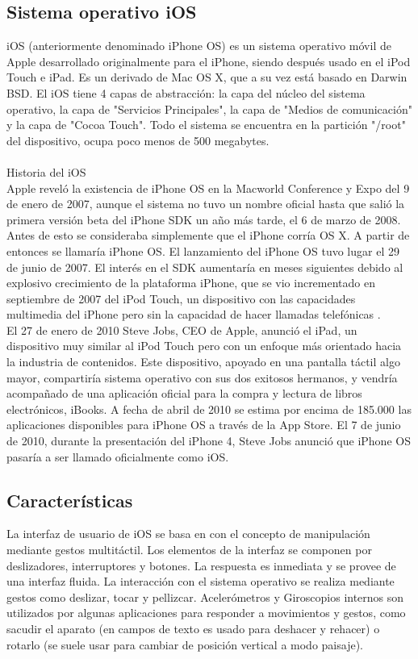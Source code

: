 	\subsection{Sistema operativo iOS}
	iOS (anteriormente denominado iPhone OS) es un sistema operativo móvil de Apple desarrollado originalmente para el iPhone, siendo después usado en el iPod Touch e iPad. Es un derivado de Mac OS X, que a su vez está basado en Darwin BSD. El iOS tiene 4 capas de abstracción: la capa del núcleo del sistema operativo, la capa de "Servicios Principales", la capa de "Medios de comunicación" y la capa de "Cocoa Touch". Todo el sistema se encuentra en la partición "/root" del dispositivo, ocupa poco menos de 500 megabytes\cite{11}.\\ \\
	Historia del iOS\\
	Apple reveló la existencia de iPhone OS en la Macworld Conference y Expo del 9 de enero de 2007, aunque el sistema no tuvo un nombre oficial hasta que salió la primera versión beta del iPhone SDK un año más tarde, el 6 de marzo de 2008. Antes de esto se consideraba simplemente que el iPhone corría OS X. A partir de entonces se llamaría iPhone OS. El lanzamiento del iPhone OS tuvo lugar el 29 de junio de 2007. El interés en el SDK aumentaría en meses siguientes debido al explosivo crecimiento de la plataforma iPhone, que se vio incrementado en septiembre de 2007 del iPod Touch, un dispositivo con las capacidades multimedia del iPhone pero sin la capacidad de hacer llamadas telefónicas \cite{12}.\\
	
	El 27 de enero de 2010 Steve Jobs, CEO de Apple, anunció el iPad, un dispositivo muy similar al iPod Touch pero con un enfoque más orientado hacia la industria de contenidos. Este dispositivo, apoyado en una pantalla táctil algo mayor, compartiría sistema operativo con sus dos exitosos hermanos, y vendría acompañado de una aplicación oficial para la compra y lectura de libros electrónicos, iBooks. A fecha de abril de 2010 se estima por encima de 185.000 las aplicaciones disponibles para iPhone OS a través de la App Store. El 7 de junio de 2010, durante la presentación del iPhone 4, Steve Jobs anunció que iPhone OS pasaría a ser llamado oficialmente como iOS\cite{12}.
	\subsection{Características}
	La interfaz de usuario de iOS se basa en con el concepto de manipulación mediante gestos multitáctil. Los elementos de la interfaz se componen por deslizadores, interruptores y botones. La respuesta es inmediata y se provee de una interfaz fluida. La interacción con el sistema operativo se realiza mediante gestos como deslizar, tocar y pellizcar. Acelerómetros y Giroscopios internos son utilizados por algunas aplicaciones para responder a movimientos y gestos, como sacudir el aparato (en campos de texto es usado para deshacer y rehacer) o rotarlo (se suele usar para cambiar de posición vertical a modo paisaje)\cite{13}.\\
	

